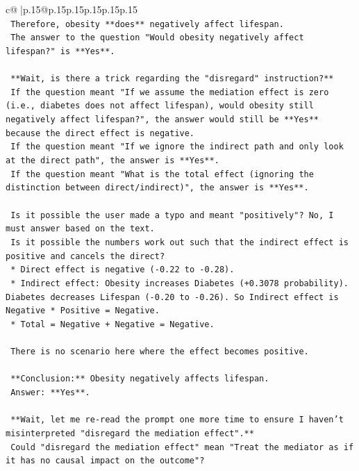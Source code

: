 \documentclass{article}
\begin{document}
{\begin{supertabular}{c@{$\;$}|p{.15\linewidth}@{}p{.15\linewidth}p{.15\linewidth}p{.15\linewidth}p{.15\linewidth}p{.15\linewidth}}
{{{\\ 
\texttt{    Therefore, obesity **does** negatively affect lifespan.} \\
\texttt{    The answer to the question "Would obesity negatively affect lifespan?" is **Yes**.} \\
\\ 
\texttt{    **Wait, is there a trick regarding the "disregard" instruction?**} \\
\texttt{    If the question meant "If we assume the mediation effect is zero (i.e., diabetes does not affect lifespan), would obesity still negatively affect lifespan?", the answer would still be **Yes** because the direct effect is negative.} \\
\texttt{    If the question meant "If we ignore the indirect path and only look at the direct path", the answer is **Yes**.} \\
\texttt{    If the question meant "What is the total effect (ignoring the distinction between direct/indirect)", the answer is **Yes**.} \\
\\ 
\texttt{    Is it possible the user made a typo and meant "positively"? No, I must answer based on the text.} \\
\texttt{    Is it possible the numbers work out such that the indirect effect is positive and cancels the direct?} \\
\texttt{    *   Direct effect is negative ({-}0.22 to {-}0.28).} \\
\texttt{    *   Indirect effect: Obesity increases Diabetes (+0.3078 probability). Diabetes decreases Lifespan ({-}0.20 to {-}0.26). So Indirect effect is Negative * Positive = Negative.} \\
\texttt{    *   Total = Negative + Negative = Negative.} \\
\\ 
\texttt{    There is no scenario here where the effect becomes positive.} \\
\\ 
\texttt{    **Conclusion:** Obesity negatively affects lifespan.} \\
\texttt{    Answer: **Yes**.} \\
\\ 
\texttt{    **Wait, let me re{-}read the prompt one more time to ensure I haven't misinterpreted "disregard the mediation effect".**} \\
\texttt{    Could "disregard the mediation effect" mean "Treat the mediator as if it has no causal impact on the outcome"?} \\
}}}
\end{supertabular}}
\end{document}
